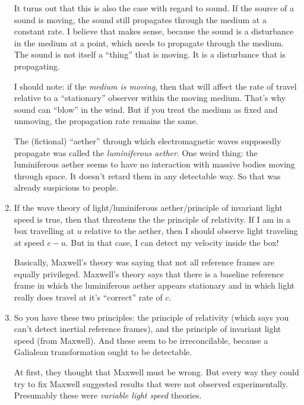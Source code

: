 \begin{enumerate}
  It turns out that this is also the case with regard to sound. If the
  source of a sound is moving, the sound still propagates through the
  medium at a constant rate. I believe that makes sense, because the
  sound is a disturbance in the medium at a point, which needs to
  propagate through the medium. The sound is not itself a ``thing'' that
  is moving. It is a disturbance that is propagating.

  I should note: if the \emph{medium is moving}, then that will affect
  the rate of travel relative to a ``stationary'' observer within the
  moving medium. That's why sound can ``blow'' in the wind. But if you
  treat the medium as fixed and unmoving, the propagation rate remains
  the same.

  The (fictional) ``aether'' through which electromagnetic waves
  supposedly propagate was called the \emph{luminiferous aether}. One
  weird thing: the luminiferous aether seems to have no interaction with
  massive bodies moving through space. It doesn't retard them in any
  detectable way. So that was already suspicious to people.

  \item If the wave theory of light/luminiferous aether/principle of
  invariant light speed is true, then that threatens the the principle
  of relativity. If I am in a box travelling at $u$ relative to the
  aether, then I should observe light traveling at speed $c - u$. But in
  that case, I can detect my velocity inside the box!

  Basically, Maxwell's theory was saying that not all reference frames
  are equally privileged. Maxwell's theory says that there is a baseline
  reference frame in which the luminiferous aether appears stationary
  and in which light really does travel at it's ``correct'' rate of $c$.

  \item So you have these two principles: the principle of relativity
  (which says you can't detect inertial reference frames), and the
  principle of invariant light speed (from Maxwell). And these seem to
  be irreconcilable, because a Galialean transformation ought to be
  detectable.

  At first, they thought that Maxwell must be wrong. But every way they
  could try to fix Maxwell suggested results that were not observed
  experimentally. Presumably these were \emph{variable light speed}
  theories.

\end{enumerate}
